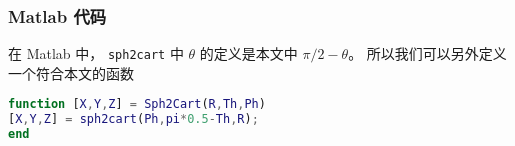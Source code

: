 \subsubsection{Matlab 代码}
在 Matlab 中， \verb|sph2cart| 中 $\theta$ 的定义是本文中 $\pi/2 - \theta$。 所以我们可以另外定义一个符合本文的函数
\begin{lstlisting}[language=matlab, caption=Sph2Cart.m]
% physics version of sph2cart
function [X,Y,Z] = Sph2Cart(R,Th,Ph)
[X,Y,Z] = sph2cart(Ph,pi*0.5-Th,R);
end
\end{lstlisting}
